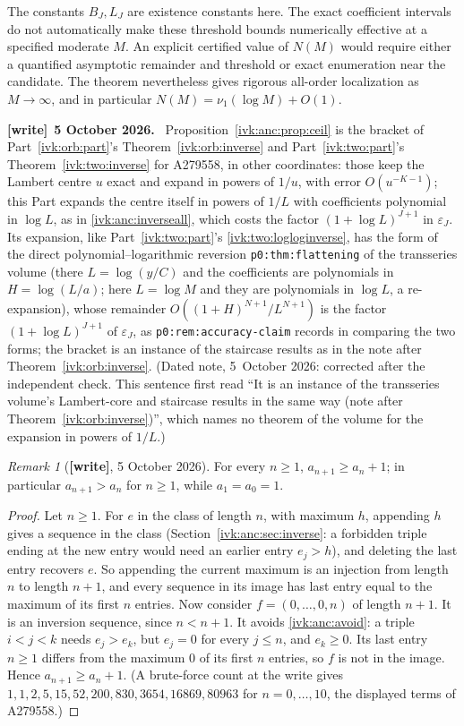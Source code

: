 \documentclass[11pt,letterpaper]{article}
\theoremstyle{remark}\newtheorem{remark}[theorem]{Remark}
\newcommand{\eps}{\varepsilon}
\newenvironment{writenote}[1][]{\par\smallskip\begingroup\small
 \noindent\textbf{[write]}\if\relax\detokenize{#1}\relax\else~\textbf{#1.}\fi\ }%
 {\par\endgroup\smallskip}
\newcommand{\wtag}{\textup{\textbf{[write]}}}
\begin{document}
The constants $B_J,L_J$ are existence constants here. The exact
coefficient intervals do not automatically make these threshold
bounds numerically effective at a specified moderate $M$.
An explicit certified value of $N(M)$ would require either a
quantified asymptotic remainder and threshold or exact enumeration
near the candidate. The theorem nevertheless gives rigorous
all-order localization as $M\to\infty$, and in particular
$N(M)=\nu_1(\log M)+O(1)$.
\begin{writenote}[5 October 2026]
Proposition~\ref{ivk:anc:prop:ceil} is the bracket of Part~\ref{ivk:orb:part}'s Theorem~\ref{ivk:orb:inverse} and Part~\ref{ivk:two:part}'s Theorem~\ref{ivk:two:inverse} for A279558, in other coordinates: those keep the Lambert centre $u$ exact and expand in powers of $1/u$, with error $O(u^{-K-1})$; this Part expands the centre itself in powers of $1/L$ with coefficients polynomial in $\log L$, as in \eqref{ivk:anc:inverseall}, which costs the factor $(1+\log L)^{J+1}$ in $\eps_J$. Its expansion, like Part~\ref{ivk:two:part}'s \eqref{ivk:two:logloginverse}, has the form of the direct polynomial--logarithmic reversion \texttt{p0:thm:flattening} of the transseries volume \cite{tsvol} (there $L=\log(y/C)$ and the coefficients are polynomials in $H=\log(L/a)$; here $L=\log M$ and they are polynomials in $\log L$, a re-expansion), whose remainder $O((1+H)^{N+1}/L^{N+1})$ is the factor $(1+\log L)^{J+1}$ of $\eps_J$, as \texttt{p0:rem:accuracy-claim} records in comparing the two forms; the bracket is an instance of the staircase results as in the note after Theorem~\ref{ivk:orb:inverse}. (Dated note, 5~October 2026: corrected after the independent check. This sentence first read ``It is an instance of the transseries volume's Lambert-core and staircase results in the same way (note after Theorem~\ref{ivk:orb:inverse})'', which names no theorem of the volume for the expansion in powers of $1/L$.)
\end{writenote}
\begin{remark}[\wtag, 5 October 2026]\label{ivk:anc:rem:strict}
For every $n\ge1$, $a_{n+1}\ge a_n+1$; in particular $a_{n+1}>a_n$ for $n\ge1$, while $a_1=a_0=1$.
\end{remark}
\begin{proof}
Let $n\ge1$. For $e$ in the class of length $n$, with maximum $h$, appending $h$ gives a sequence in the class (Section~\ref{ivk:anc:sec:inverse}: a forbidden triple ending at the new entry would need an earlier entry $e_j>h$), and deleting the last entry recovers $e$. So appending the current maximum is an injection from length $n$ to length $n+1$, and every sequence in its image has last entry equal to the maximum of its first $n$ entries. Now consider $f=(0,\ldots,0,n)$ of length $n+1$. It is an inversion sequence, since $n<n+1$. It avoids \eqref{ivk:anc:avoid}: a triple $i<j<k$ needs $e_j>e_k$, but $e_j=0$ for every $j\le n$, and $e_k\ge0$. Its last entry $n\ge1$ differs from the maximum $0$ of its first $n$ entries, so $f$ is not in the image. Hence $a_{n+1}\ge a_n+1$. (A brute-force count at the write gives $1,1,2,5,15,52,200,830,3654,16869,80963$ for $n=0,\ldots,10$, the displayed terms of A279558.)
\end{proof}
\end{document}
